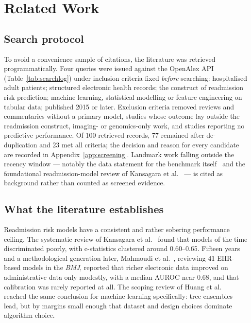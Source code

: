 \documentclass[runningheads]{llncs}
\begin{document}
\section{Related Work}
\label{sec:related}

\subsection{Search protocol}

To avoid a convenience sample of citations, the literature was retrieved
programmatically. Four queries were issued against the OpenAlex API
(Table~\ref{tab:searchlog}) under inclusion criteria fixed \emph{before} searching:
hospitalised adult patients; structured electronic health records; the construct of
readmission risk prediction; machine learning, statistical modelling or feature
engineering on tabular data; published 2015 or later. Exclusion criteria removed
reviews and commentaries without a primary model, studies whose outcome lay outside
the readmission construct, imaging- or genomics-only work, and studies reporting no
predictive performance. Of 100 retrieved records, 77 remained after de-duplication and
23 met all criteria; the decision and reason for every candidate are recorded in
Appendix~\ref{app:screening}. Landmark work falling outside the recency window ---
notably the data statement for the benchmark itself~\cite{strack2014} and the
foundational readmission-model review of Kansagara et al.~\cite{kansagara2011} --- is
cited as background rather than counted as screened evidence.



\subsection{What the literature establishes}

Readmission risk models have a consistent and rather sobering performance ceiling. The
systematic review of Kansagara et al.~\cite{kansagara2011} found that models of the
time discriminated poorly, with c-statistics clustered around 0.60--0.65. Fifteen
years and a methodological generation later, Mahmoudi et al.~\cite{mahmoudi2020},
reviewing 41 EHR-based models in the \emph{BMJ}, reported that richer electronic data
improved on administrative data only modestly, with a median AUROC near 0.68, and that
calibration was rarely reported at all. The scoping review of Huang et
al.~\cite{huang2021scoping} reached the same conclusion for machine learning
specifically: tree ensembles lead, but by margins small enough that dataset and design
choices dominate algorithm choice.
\end{document}
